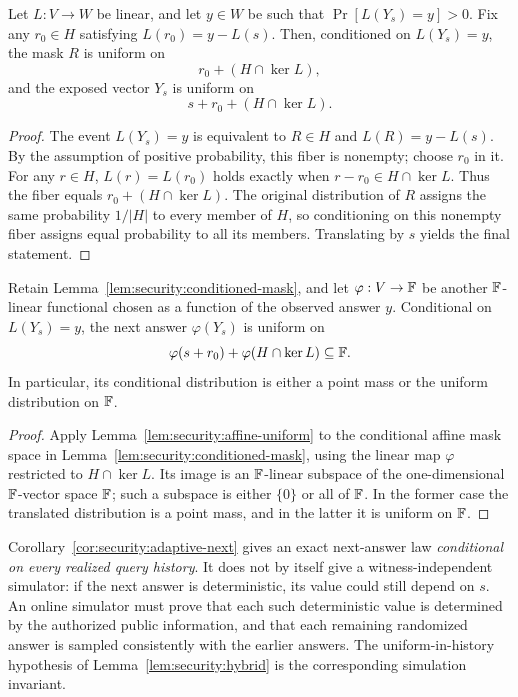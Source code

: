 \begin{lemma}\label{lem:security:conditioned-mask}
Let $L:V\to W$ be linear, and let $y\in W$ be such that
$\Pr[L(Y_s)=y]>0$. Fix any $r_0\in H$ satisfying
$L(r_0)=y-L(s)$. Then, conditioned on $L(Y_s)=y$, the mask $R$ is uniform on
\[
 r_0+(H\cap\ker L),
\]
and the exposed vector $Y_s$ is uniform on
\[
 s+r_0+(H\cap\ker L).
\]
\end{lemma}
\begin{proof}
The event $L(Y_s)=y$ is equivalent to $R\in H$ and
$L(R)=y-L(s)$. By the assumption of positive probability, this fiber is nonempty; choose $r_0$ in it. For any $r\in H$,
$L(r)=L(r_0)$ holds exactly when $r-r_0\in H\cap\ker L$. Thus the fiber equals $r_0+(H\cap\ker L)$. The original distribution of $R$ assigns the same probability $1/|H|$ to every member of $H$, so conditioning on this nonempty fiber assigns equal probability to all its members. Translating by $s$ yields the final statement.
\end{proof}

\begin{corollary}\label{cor:security:adaptive-next}
Retain Lemma~\ref{lem:security:conditioned-mask}, and let $\varphi:V\to\mathbb{F}$ be another $\mathbb{F}$-linear functional chosen as a function of the observed answer $y$. Conditional on $L(Y_s)=y$, the next answer $\varphi(Y_s)$ is uniform on
\[
 \varphi(s+r_0)+\varphi(H\cap\ker L)\subseteq\mathbb{F}.
\]
In particular, its conditional distribution is either a point mass or the uniform distribution on $\mathbb{F}$.
\end{corollary}
\begin{proof}
Apply Lemma~\ref{lem:security:affine-uniform} to the conditional affine mask space in Lemma~\ref{lem:security:conditioned-mask}, using the linear map $\varphi$ restricted to $H\cap\ker L$. Its image is an $\mathbb{F}$-linear subspace of the one-dimensional $\mathbb{F}$-vector space $\mathbb{F}$; such a subspace is either $\{0\}$ or all of $\mathbb{F}$. In the former case the translated distribution is a point mass, and in the latter it is uniform on $\mathbb{F}$.
\end{proof}

\begin{remark}
Corollary~\ref{cor:security:adaptive-next} gives an exact next-answer law \emph{conditional on every realized query history}. It does not by itself give a witness-independent simulator: if the next answer is deterministic, its value could still depend on $s$. An online simulator must prove that each such deterministic value is determined by the authorized public information, and that each remaining randomized answer is sampled consistently with the earlier answers. The uniform-in-history hypothesis of Lemma~\ref{lem:security:hybrid} is the corresponding simulation invariant.
\end{remark}


